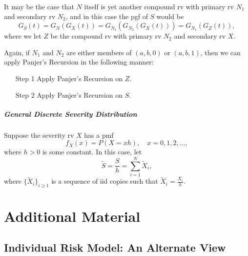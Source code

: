 \documentclass[notoc,notitlepage]{tufte-book}
\begin{document}
It may be the case that $N$ itself is yet another compound rv with primary rv $N_1$ and secondary rv $N_2$, and in this case the pgf of $S$ would be
\begin{equation*}
  G_S(t) = G_N( G_X(t) ) = G_{N_1}( G_{N_2}( G_X(t) ) ) = G_{N_1}(G_Z(t)),
\end{equation*}
where we let $Z$ be the compound rv with primary rv $N_2$ and secondary rv $X$.

Again, if $N_1$ and $N_2$ are either members of $(a, b, 0)$ or $(a, b, 1)$, then we can apply Panjer's Recursion in the following manner:
\begin{itemize}
  \item[Step 1] Apply Panjer's Recursion on $Z$.
  \item[Step 2] Apply Panjer's Recursion on $S$.
\end{itemize}

\paragraph{General Discrete Severity Distribution} Suppose the severity rv $X$ has a pmf 
\begin{equation*}
  f_X(x) = P(X = xh), \quad x = 0, 1, 2, \ldots,
\end{equation*}
where $h > 0$ is some constant. In this case, let
\begin{equation*}
  \tilde{S} = \frac{S}{h} = \sum_{i=1}^{N} \tilde{X}_i,
\end{equation*}
where $\{\tilde{X}_i\}_{i \geq 1}$ is a sequence of iid copies such that $\tilde{X}_i = \frac{X_i}{h}$.




\appendix

\chapter{Additional Material}%
\label{chp:additional_material}

\section{Individual Risk Model: An Alternate View}%
\label{sec:individual_risk_model_an_alternate_view}
\end{document}
